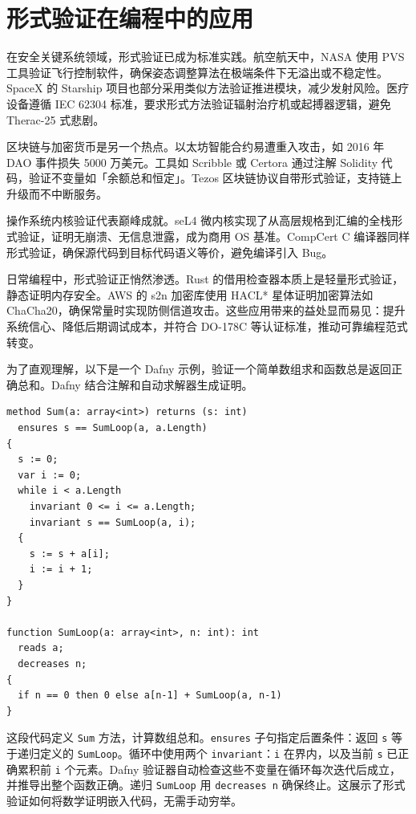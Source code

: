 \chapter{形式验证在编程中的应用}
在安全关键系统领域，形式验证已成为标准实践。航空航天中，NASA 使用 PVS 工具验证飞行控制软件，确保姿态调整算法在极端条件下无溢出或不稳定性。SpaceX 的 Starship 项目也部分采用类似方法验证推进模块，减少发射风险。医疗设备遵循 IEC 62304 标准，要求形式方法验证辐射治疗机或起搏器逻辑，避免 Therac-25 式悲剧。\par
区块链与加密货币是另一个热点。以太坊智能合约易遭重入攻击，如 2016 年 DAO 事件损失 5000 万美元。工具如 Scribble 或 Certora 通过注解 Solidity 代码，验证不变量如「余额总和恒定」。Tezos 区块链协议自带形式验证，支持链上升级而不中断服务。\par
操作系统内核验证代表巅峰成就。seL4 微内核实现了从高层规格到汇编的全栈形式验证，证明无崩溃、无信息泄露，成为商用 OS 基准。CompCert C 编译器同样形式验证，确保源代码到目标代码语义等价，避免编译引入 Bug。\par
日常编程中，形式验证正悄然渗透。Rust 的借用检查器本质上是轻量形式验证，静态证明内存安全。AWS 的 s2n 加密库使用 HACL* 星体证明加密算法如 ChaCha20，确保常量时实现防侧信道攻击。这些应用带来的益处显而易见：提升系统信心、降低后期调试成本，并符合 DO-178C 等认证标准，推动可靠编程范式转变。\par
为了直观理解，以下是一个 Dafny 示例，验证一个简单数组求和函数总是返回正确总和。Dafny 结合注解和自动求解器生成证明。\par
\begin{lstlisting}
method Sum(a: array<int>) returns (s: int)
  ensures s == SumLoop(a, a.Length)
{
  s := 0;
  var i := 0;
  while i < a.Length
    invariant 0 <= i <= a.Length;
    invariant s == SumLoop(a, i);
  {
    s := s + a[i];
    i := i + 1;
  }
}

function SumLoop(a: array<int>, n: int): int
  reads a;
  decreases n;
{
  if n == 0 then 0 else a[n-1] + SumLoop(a, n-1)
}
\end{lstlisting}
这段代码定义 \texttt{Sum} 方法，计算数组总和。\texttt{ensures} 子句指定后置条件：返回 \texttt{s} 等于递归定义的 \texttt{SumLoop}。循环中使用两个 \texttt{invariant}：\texttt{i} 在界内，以及当前 \texttt{s} 已正确累积前 \texttt{i} 个元素。Dafny 验证器自动检查这些不变量在循环每次迭代后成立，并推导出整个函数正确。递归 \texttt{SumLoop} 用 \texttt{decreases n} 确保终止。这展示了形式验证如何将数学证明嵌入代码，无需手动穷举。\par
